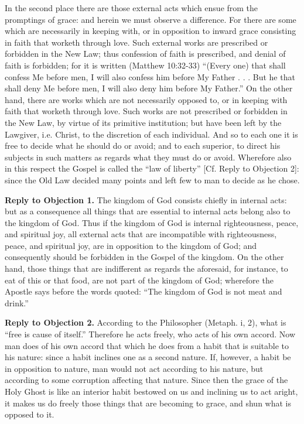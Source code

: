 In the second place there are those external acts which ensue from the promptings of grace: and herein we must observe a difference. For there are some which are necessarily in keeping with, or in opposition to inward grace consisting in faith that worketh through love. Such external works are prescribed or forbidden in the New Law; thus confession of faith is prescribed, and denial of faith is forbidden; for it is written (Matthew 10:32-33) ``(Every one) that shall confess Me before men, I will also confess him before My Father . . . But he that shall deny Me before men, I will also deny him before My Father.'' On the other hand, there are works which are not necessarily opposed to, or in keeping with faith that worketh through love. Such works are not prescribed or forbidden in the New Law, by virtue of its primitive institution; but have been left by the Lawgiver, i.e. Christ, to the discretion of each individual. And so to each one it is free to decide what he should do or avoid; and to each superior, to direct his subjects in such matters as regards what they must do or avoid. Wherefore also in this respect the Gospel is called the ``law of liberty'' [Cf. Reply to Objection 2]: since the Old Law decided many points and left few to man to decide as he chose.

\textbf{Reply to Objection 1.} The kingdom of God consists chiefly in internal acts: but as a consequence all things that are essential to internal acts belong also to the kingdom of God. Thus if the kingdom of God is internal righteousness, peace, and spiritual joy, all external acts that are incompatible with righteousness, peace, and spiritual joy, are in opposition to the kingdom of God; and consequently should be forbidden in the Gospel of the kingdom. On the other hand, those things that are indifferent as regards the aforesaid, for instance, to eat of this or that food, are not part of the kingdom of God; wherefore the Apostle says before the words quoted: ``The kingdom of God is not meat and drink.''

\textbf{Reply to Objection 2.} According to the Philosopher (Metaph. i, 2), what is ``free is cause of itself.'' Therefore he acts freely, who acts of his own accord. Now man does of his own accord that which he does from a habit that is suitable to his nature: since a habit inclines one as a second nature. If, however, a habit be in opposition to nature, man would not act according to his nature, but according to some corruption affecting that nature. Since then the grace of the Holy Ghost is like an interior habit bestowed on us and inclining us to act aright, it makes us do freely those things that are becoming to grace, and shun what is opposed to it.

